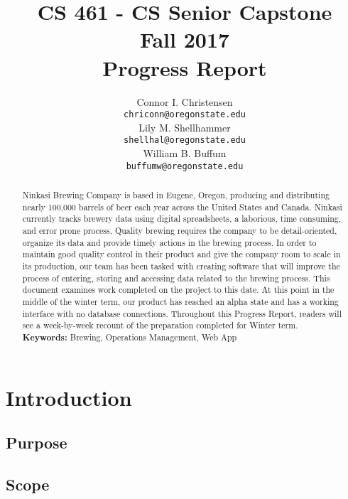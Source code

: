 \documentclass[draftclsnofoot,onecolumn,letterpaper,10pt,compsoc]{IEEEtran}
\title{CS 461 - CS Senior Capstone
	\\Fall 2017
	\\Progress Report
}
\author{
	Connor I. Christensen \\
	\texttt{chriconn@oregonstate.edu}
	\\
	Lily M. Shellhammer \\
	\texttt{shellhal@oregonstate.edu}
	\\
	William B. Buffum \\
	\small{}
	\texttt{buffumw@oregonstate.edu}
}
\begin{document}
\begin{titlingpage}
    \maketitle
    \begin{abstract}
			Ninkasi Brewing Company is based in Eugene, Oregon, producing and distributing nearly 100,000 barrels of beer each year across the United States and Canada.
			Ninkasi currently tracks brewery data using digital spreadsheets, a laborious, time consuming, and error prone process.
			Quality brewing requires the company to be detail-oriented, organize its data and provide timely actions in the brewing process.
			In order to maintain good quality control in their product and give the company room to scale in its production, our team has been tasked with creating software that will improve the process of entering, storing and accessing data related to the brewing process.
			This document examines work completed on the project to this date.
			At this point in the middle of the winter term, our product has reached an alpha state and has a working interface with no database connections.
			Throughout this Progress Report, readers will see a week-by-week recount of the preparation completed for Winter term.
			\\
			\textbf{Keywords:} Brewing, Operations Management, Web App
    \end{abstract}
		\pagebreak
		\tableofcontents
\end{titlingpage}


\section{Introduction}
\subsection{Purpose}
\subsection{Scope}
\end{document}
